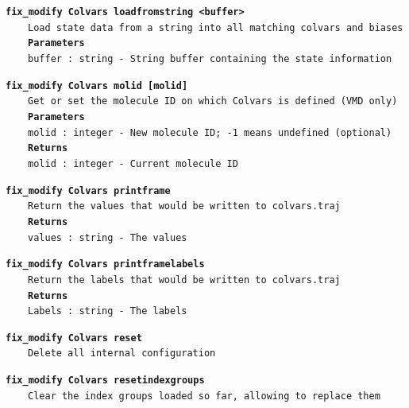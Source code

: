 \begin{mdexampleinput}{}
\texttt{\textbf{fix\_modify Colvars loadfromstring <buffer>}}
\\
\-~~~~\texttt{Load state data from a string into all matching colvars and biases}
\\
\-~~~~\texttt{\textbf{Parameters}}
\\
\-~~~~\texttt{buffer : string - String buffer containing the state information}
\end{mdexampleinput}
\begin{mdexampleinput}{}
\texttt{\textbf{fix\_modify Colvars molid [molid]}}
\\
\-~~~~\texttt{Get or set the molecule ID on which Colvars is defined (VMD only)}
\\
\-~~~~\texttt{\textbf{Parameters}}
\\
\-~~~~\texttt{molid : integer - New molecule ID; -1 means undefined (optional)}
\\
\-~~~~\texttt{\textbf{Returns}}
\\
\-~~~~\texttt{molid : integer - Current molecule ID}
\end{mdexampleinput}
\begin{mdexampleinput}{}
\texttt{\textbf{fix\_modify Colvars printframe}}
\\
\-~~~~\texttt{Return the values that would be written to colvars.traj}
\\
\-~~~~\texttt{\textbf{Returns}}
\\
\-~~~~\texttt{values : string - The values}
\end{mdexampleinput}
\begin{mdexampleinput}{}
\texttt{\textbf{fix\_modify Colvars printframelabels}}
\\
\-~~~~\texttt{Return the labels that would be written to colvars.traj}
\\
\-~~~~\texttt{\textbf{Returns}}
\\
\-~~~~\texttt{Labels : string - The labels}
\end{mdexampleinput}
\begin{mdexampleinput}{}
\texttt{\textbf{fix\_modify Colvars reset}}
\\
\-~~~~\texttt{Delete all internal configuration}
\end{mdexampleinput}
\begin{mdexampleinput}{}
\texttt{\textbf{fix\_modify Colvars resetindexgroups}}
\\
\-~~~~\texttt{Clear the index groups loaded so far, allowing to replace them}
\end{mdexampleinput}
